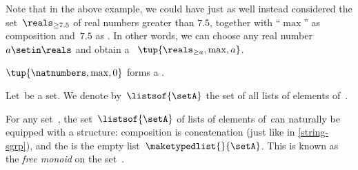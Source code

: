 \begin{remark}
    Note that in the above example, we could have just as well instead considered the set~$\reals_{\geq 7.5}$ of real numbers greater than $7.5$, together with ``$\max$'' as composition and~$7.5$ as .
    In other words, we can choose any real number $a \setin \reals$ and obtain a  ~$\tup{\reals_{\geq a},\max, a}$.
\end{remark}

\begin{example}
    $\tup{\natnumbers, \max,0}$ forms a .
\end{example}

\begin{definition}
    \label{def:set-of-lists}
    Let~\setA be a set.
    We denote by~$\listsof{\setA}$ the set of all lists of elements of~\setA.
\end{definition}

\begin{example}
    \label{exa:string-monoid}
    For any set~\setA, the set~$\listsof{\setA}$ of lists of elements of~\setA can naturally be equipped with a  structure: composition is concatenation (just like in \cref{string-sgrp}), and the  is the empty list~$\maketypedlist{}{\setA}$.
    This  is known as the \emph{free monoid} on the set~\setA.
\end{example}

